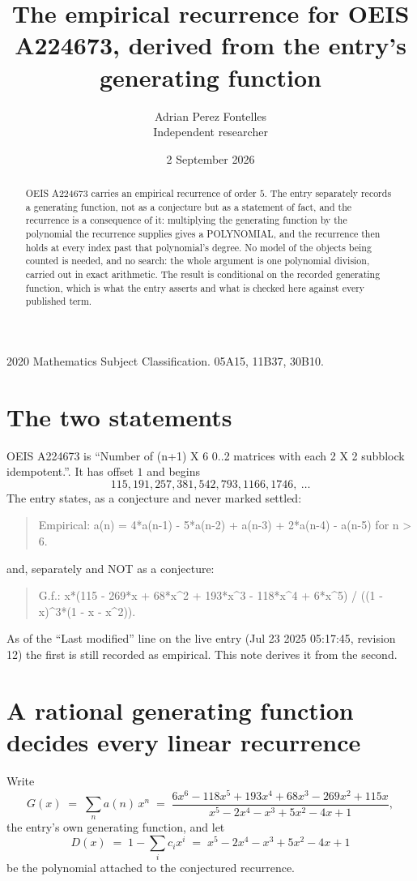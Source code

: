 \documentclass[11pt,a4paper]{article}
\title{The empirical recurrence for OEIS A224673, derived from the entry's generating function}
\author{Adrian Perez Fontelles\\ \small Independent researcher}
\date{2 September 2026}
\theoremstyle{plain}
\theoremstyle{definition}
\begin{document}
\maketitle

\begin{abstract}
OEIS A224673 carries an empirical recurrence of order $5$. The entry separately records a
generating function, not as a conjecture but as a statement of fact, and the recurrence is a
consequence of it: multiplying the generating function by the polynomial the recurrence
supplies gives a POLYNOMIAL, and the recurrence then holds at every index past that
polynomial's degree. No model of the objects being counted is needed, and no search: the
whole argument is one polynomial division, carried out in exact arithmetic. The result is
conditional on the recorded generating function, which is what the entry asserts and what is
checked here against every published term.
\end{abstract}

\noindent\small 2020 Mathematics Subject Classification. 05A15, 11B37, 30B10.\normalsize

\section{The two statements}

OEIS A224673 is ``Number of (n+1) X 6 0..2 matrices with each 2 X 2 subblock idempotent.''. It has offset $1$ and begins
\[
115, 191, 257, 381, 542, 793, 1166, 1746,\ \dots
\]
The entry states, as a conjecture and never marked settled:
\begin{quote}
Empirical: a(n) = 4*a(n-1) - 5*a(n-2) + a(n-3) + 2*a(n-4) - a(n-5) for n > 6.
\end{quote}
and, separately and NOT as a conjecture:
\begin{quote}
G.f.: x*(115 - 269*x + 68*x\^{}2 + 193*x\^{}3 - 118*x\^{}4 + 6*x\^{}5) / ((1 - x)\^{}3*(1 - x - x\^{}2)).
\end{quote}
As of the ``Last modified'' line on the live entry (Jul 23 2025 05:17:45, revision 12) the first is still
recorded as empirical. This note derives it from the second.

\section{A rational generating function decides every linear recurrence}

Write
\[
G(x)\;=\;\sum_{n}a(n)\,x^{n}\;=\;\frac{6 x^{6} - 118 x^{5} + 193 x^{4} + 68 x^{3} - 269 x^{2} + 115 x}{x^{5} - 2 x^{4} - x^{3} + 5 x^{2} - 4 x + 1},
\]
the entry's own generating function, and let
\[
D(x)\;=\;1-\sum_i c_i x^{i}\;=\;x^{5} - 2 x^{4} - x^{3} + 5 x^{2} - 4 x + 1
\]
be the polynomial attached to the conjectured recurrence.
\end{document}
